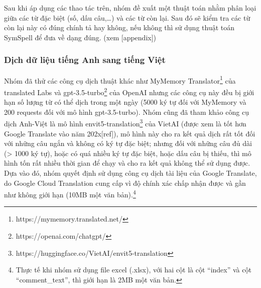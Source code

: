 Sau khi áp dụng các thao tác trên, nhóm đề xuất một thuật toán nhằm phân loại giữa các từ đặc biệt (số, dấu câu,\dots) và các từ còn lại. Sau đó sẽ kiểm tra các từ còn lại này có đúng chính tả hay không, nếu không thì sử dụng thuật toán SymSpell để đưa về dạng đúng. (xem [appendix])

\subsubsection{Dịch dữ liệu tiếng Anh sang tiếng Việt}
Nhóm đã thử các công cụ dịch thuật khác như MyMemory Translator\footnote{https://mymemory.translated.net/} của translated Labs và gpt-3.5-turbo\footnote{https://openai.com/chatgpt/} của OpenAI nhưng các công cụ này đều bị giới hạn số lượng từ có thể dịch trong một ngày (5000 ký tự đối với MyMemory và 200 requests đối với mô hình gpt-3.5-turbo). Nhóm cũng đã tham khảo công cụ dịch Anh-Việt là mô hình envit5-translation\footnote{https://huggingface.co/VietAI/envit5-translation} của VietAI (được xem là tốt hơn Google Translate vào năm 202x[ref]), mô hình này cho ra kết quả dịch rất tốt đối với những câu ngắn và không có ký tự đặc biệt; nhưng đối với những câu đủ dài (> 1000 ký tự), hoặc có quá nhiều ký tự đặc biệt, hoặc dấu câu bị thiếu, thì mô hình tốn rất nhiều thời gian để chạy và cho ra kết quả không thể sử dụng được. Dựa vào đó, nhóm quyết định sử dụng công cụ dịch tài liệu của Google Translate, do Google Cloud Translation cung cấp vì độ chính xác chấp nhận được và gần như không giới hạn (10MB một văn bản).\footnote{Thực tế khi nhóm sử dụng file excel (.xlsx), với hai cột là cột ``index'' và cột ``comment\_text'', thì giới hạn là 2MB một văn bản.}

